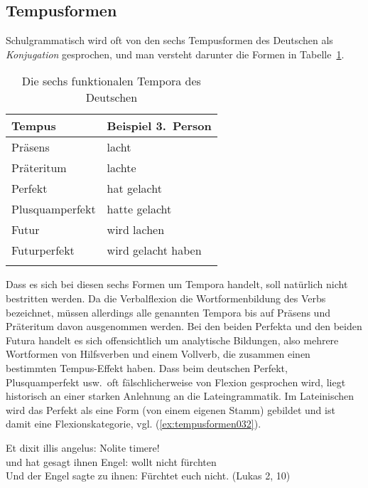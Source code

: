 \subsection{Tempusformen}
\label{sec:tempusformen}

Schulgrammatisch wird oft von den sechs Tempusformen des Deutschen als \textit{Konjugation} gesprochen, und man versteht darunter \idR die Formen in Tabelle~\ref{tab:tempusformen031}.

\begin{table}[!htbp]
  \centering
  \begin{tabular}{ll}
    \lsptoprule
    \textbf{Tempus} & \textbf{Beispiel 3.~Person}\\
    \midrule
    Präsens & lacht \\
    Präteritum & lachte \\
    Perfekt & hat gelacht \\
    Plusquamperfekt & hatte gelacht \\
    Futur & wird lachen \\
    Futurperfekt & wird gelacht haben \\
    \lspbottomrule
  \end{tabular}
  \caption{Die sechs funktionalen Tempora des Deutschen}
  \label{tab:tempusformen031}
\end{table}

Dass es sich bei diesen sechs Formen um Tempora handelt, soll natürlich nicht bestritten werden.
Da die Verbalflexion die Wortformenbildung des Verbs bezeichnet, müssen allerdings alle genannten Tempora bis auf Präsens und Präteritum davon ausgenommen werden.
Bei den beiden Perfekta und den beiden Futura handelt es sich offensichtlich um analytische Bildungen, also mehrere Wortformen von Hilfsverben und einem Vollverb, die zusammen einen bestimmten Tempus-Effekt haben.
Dass beim deutschen Perfekt, Plusquamperfekt usw.\ oft fälschlicherweise von Flexion gesprochen wird, liegt historisch an einer starken Anlehnung an die Lateingrammatik.
Im Lateinischen wird \zB das Perfekt als eine Form (von einem eigenen Stamm) gebildet und ist damit eine Flexionskategorie, vgl. (\ref{ex:tempusformen032}).

\begin{exe}
  \ex\label{ex:tempusformen032}\gll Et dixit illis angelus: Nolite timere!\\
  und {hat gesagt} ihnen {Engel}: {wollt nicht} fürchten\\
  \glt Und der Engel sagte zu ihnen: Fürchtet euch nicht. (Lukas 2, 10)
\end{exe}

